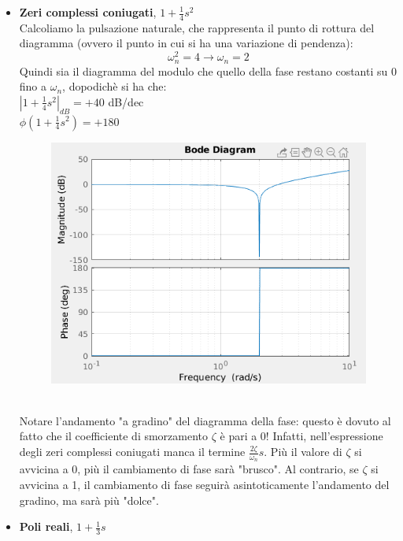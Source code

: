 \documentclass[12pt,a4paper]{article}
\begin{document}
\begin{itemize}
\begin{figure}[h!]
		\end{figure}
		\newpage
		\item \textbf{Zeri complessi coniugati}, $1+\frac{1}{4}s^2$\vspace{5px}\\
		Calcoliamo la pulsazione naturale, che rappresenta il punto di rottura del diagramma (ovvero il punto in cui si ha una variazione di pendenza):
		\[
			\omega_n^2 = 4 \rightarrow \omega_n = 2
		\]
		Quindi sia il diagramma del modulo che quello della fase restano costanti su 0 fino a $\omega_n$, dopodich\`e si ha che:\\
		$\left|1+\frac{1}{4}s^2\right|_{dB} = +40$ dB/dec\\
		$\phi\left(1+\frac{1}{4}s^2\right) = +180$\degree
		\begin{figure}[h!]
			\centering
			\includegraphics[scale=0.5]{./images/bode46_3.png}
		\end{figure}
		\\Notare l'andamento "a gradino" del diagramma della fase: questo \`e dovuto al fatto che il coefficiente di smorzamento $\zeta$ \`e pari a 0! Infatti, nell'espressione degli zeri complessi coniugati manca il termine $\frac{2\zeta}{\omega_n}s$. Pi\`u il valore di $\zeta$ si avvicina a 0, pi\`u il cambiamento di fase sar\`a "brusco". Al contrario, se $\zeta$ si avvicina a 1, il cambiamento di fase seguir\`a asintoticamente l'andamento del gradino, ma sar\`a pi\`u "dolce".
		\item \textbf{Poli reali}, $1 + \frac{1}{3}s$\vspace{5px}\\

\end{itemize}
\end{document}
